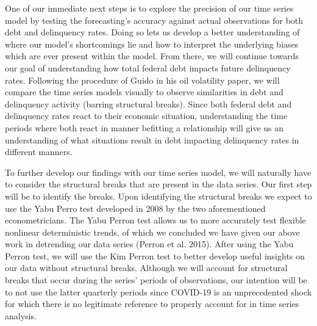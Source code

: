 \documentclass[11pt, oneside]{article}   	%
\begin{document}
One of our immediate next steps is to explore the precision of our time series model by testing the forecasting’s accuracy against actual observations for both debt and delinquency rates. Doing so lets us develop a better understanding of where our model’s shortcomings lie and how to interpret the underlying biases which are ever present within the model. From there, we will continue towards our goal of understanding how total federal debt impacts future delinquency rates. Following the procedure of Guido in his oil volatility paper, we will compare the time series models visually to observe similarities in debt and delinquency activity (barring structural breaks). Since both federal debt and delinquency rates react to their economic situation, understanding the time periods where both react in manner befitting a relationship will give us an understanding of what situations result in debt impacting delinquency rates in different manners.

To further develop our findings with our time series model, we will naturally have to consider the structural breaks that are present in the data series. Our first step will be to identify the breaks. Upon identifying the structural breaks we expect to use the Yabu Perro test developed in 2008 by the two aforementioned econometricians. The Yabu Perron test allows us to more accurately test flexible nonlinear deterministic trends, of which we concluded we have given our above work in detrending our data series (Perron et al. 2015). After using the Yabu Perron test, we will use the Kim Perron test to better develop useful insights on our data without structural breaks. Although we will account for structural breaks that occur during the series’ periods of observations, our intention will be to not use the latter quarterly periods since COVID-19 is an unprecedented shock for which there is no legitimate reference to properly account for in time series analysis. 
\end{document}
